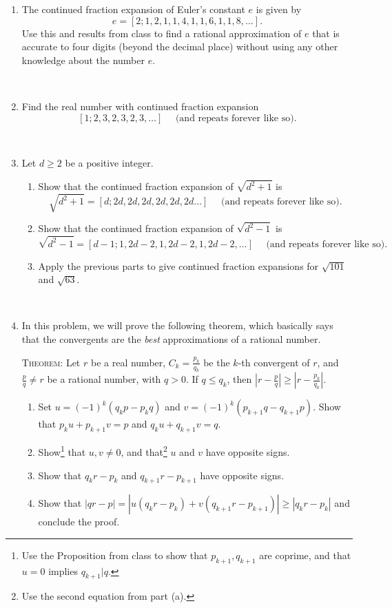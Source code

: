 \documentclass{amsart}
\begin{document}
\begin{enumerate}

\item The continued fraction expansion of Euler's constant $e$ is given by
\[ e = [2;1,2,1,1,4,1,1,6,1,1,8, \dots].\]
Use this and results from class to find a rational approximation of $e$ that is accurate to four digits (beyond the decimal place) without using any other knowledge about the number $e$.

\


\item Find the real number with continued fraction expansion 
\[[1; 2,3,2,3,2,3,\dots]\quad \text{ (and repeats forever like so).}\]

\

\item Let $d\geq  2$ be a positive integer. \begin{enumerate}
\item Show that the continued fraction expansion of $\sqrt{d^2+1}$ is 
\[\sqrt{d^2+1}=  [d; 2d, 2d, 2d, 2d, 2d, 2d \dots]\quad \text{ (and repeats forever like so).}\]

\item Show that the continued fraction expansion of $\sqrt{d^2-1}$ is 
\[\sqrt{d^2-1} = [d-1; 1,  2d-2, 1, 2d-2, 1, 2d-2, \dots] \quad \text{ (and repeats forever like so).}\]
\item Apply the previous parts to give continued fraction expansions for $\sqrt{101}$ and $\sqrt{63}$.
\end{enumerate}


\


\item In this problem, we will prove the following theorem, which basically says that the convergents are the \emph{best} approximations of a rational number. 

\noindent \textsc{Theorem:} Let $r$ be a real number, $C_k= \frac{p_k}{q_k}$ be the $k$-th convergent of $r$, and $\frac{p}{q}\neq r$ be a rational number, with $q>0$. If $q \leq q_k$, then  $\displaystyle \left| r-\frac{p}{q} \right| \geq \left| r-\frac{p_k}{q_k} \right| $.

\begin{enumerate} 
\item Set $u=(-1)^k (q_k p -  p_k q)$ and $v=(-1)^k( p_{k+1} q - q_{k+1} p)$. Show that $p_k u + p_{k+1} v = p$ and $q_k u + q_{k+1} v = q$.
\item Show\footnote{Use the Proposition from class to show that $p_{k+1}, q_{k+1}$ are coprime, and that $u=0$ implies $q_{k+1} | q$.} that $u,v\neq 0$, and that\footnote{Use the second equation from part (a).} $u$ and $v$ have opposite signs.
\item Show that $q_k r - p_k$ and $q_{k+1} r - p_{k+1}$ have opposite signs.
\item Show that $|q r - p| = |u (q_k r - p_k) + v(q_{k+1} r - p_{k+1})| \geq |q_k r - p_k|$ and conclude the proof.
\end{enumerate}

\end{enumerate}
\end{document}
